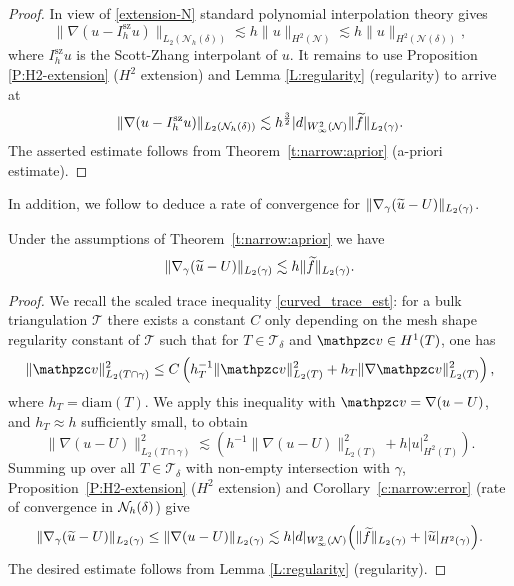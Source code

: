 \begin{proof}
In view of \eqref{extension-N} standard polynomial interpolation theory gives
%
$$
\| \nabla (u  - I_h^{\textrm{sz}}u) \|_{L_2(\mathcal N_h(\delta))}
\lesssim h \| u \|_{H^2(\mathcal N)}
\lesssim h \| u \|_{H^2(\mathcal N(\delta))},
$$
%
where $I_h^{\textrm{sz}}u$ is the Scott-Zhang interpolant of $u$.
%
It remains to use Proposition \ref{P:H2-extension} ($H^2$ extension)
and Lemma \ref{L:regularity} (regularity) to arrive at
%
$$
\| \nabla (u  -I_h^{\textrm{sz}} u)\|_{L_2(\mathcal N_h(\delta))} \lesssim h^{\frac32}
|d|_{W^2_\infty(\mathcal{N})}  \| \widetilde{f} \|_{L_2(\gamma)}.
$$
%
The asserted estimate follows from Theorem~\ref{t:narrow:aprior} (a-priori estimate).
\end{proof}

In addition, we follow \cite{MR3471100} to deduce a rate of convergence for
$\| \nabla_\gamma (\widetilde{u} -U)\|_{L_2(\gamma)}$.
%
\begin{corollary}\label{C:rate-gamma}
Under the assumptions of Theorem~\ref{t:narrow:aprior} we have  
%
$$
\| \nabla_\gamma ( \widetilde u - U ) \|_{L_2(\gamma)} \lesssim h \| \widetilde{f} \|_{L_2(\gamma)}.
$$
\end{corollary}
%
\begin{proof}
We recall the scaled trace inequality \eqref{curved_trace_est}: for a bulk triangulation $\mathcal T$  there exists a constant $C$ only depending on the mesh shape regularity constant of $\mathcal T$ such that for $T \in \mathcal T_\delta$ and $\tv \in H^1(T)$, one has
%
\begin{equation*}\label{e:bulk_trace}
  \| \tv \|_{L_2(T \cap \gamma)}^2 \leq C \left( h_T^{-1} \| \tv \|_{L_2(T)}^2
  + h_T \| \nabla \tv \|_{L_2(T)}^2 \right),
\end{equation*}
where $h_T = \mathrm{diam}(T)$.
We apply this inequality with $\tv = \nabla(u-U)$, and $h_T\approx h$ sufficiently small,
to obtain
%
$$
\| \nabla (u -U) \|_{L_2(T\cap \gamma)}^2 \lesssim \left( h^{-1}
\| \nabla(u-U) \|_{L_2(T)}^2 + h | u |_{H^2(T)}^2 \right).
$$
Summing up over all $T \in \mathcal T_\delta$ with non-empty intersection with $\gamma$, Proposition~\ref{P:H2-extension} ($H^2$ extension) and Corollary~\ref{c:narrow:error} (rate of convergence in ${\mathcal{N}_h(\delta)}$) give
$$
\| \nabla_\gamma (\widetilde u-U) \|_{L_2(\gamma)} \leq \| \nabla (u-U) \|_{L_2(\gamma)}
\lesssim h |d|_{W^2_\infty(\mathcal{N})} \Big( \| \widetilde{f} \|_{L_2(\gamma)} +
| \widetilde{u} |_{H^2(\gamma)} \Big).
$$
The desired estimate follows from Lemma \ref{L:regularity} (regularity).
\end{proof}
